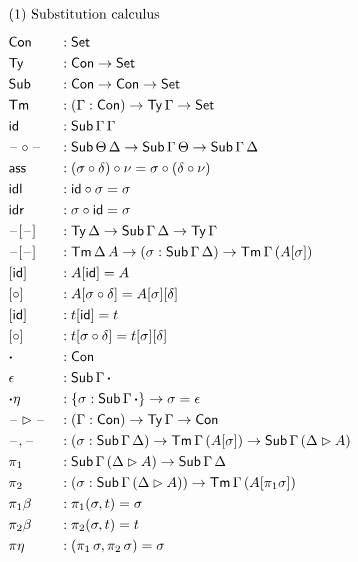 \documentclass[a4paper,UKenglish,cleveref, autoref]{lipics-v2019}
\begin{document}
\begin{alignat*}{5}
  & \rlap{(1) Substitution calculus} \\[0.5em]
  & \Con && : \Set \\
  & \Ty  && : \Con\ra\Set \\
  & \Sub  && : \Con\ra\Con\ra\Set \\
  & \Tm  && : (\Gamma:\Con)\ra\Ty\,\Gamma\ra\Set \\
  & \id && : \Sub\,\Gamma\,\Gamma \\
  & \blank\circ\blank && : \Sub\,\Theta\,\Delta\ra\Sub\,\Gamma\,\Theta\ra\Sub\,\Gamma\,\Delta \\
  & \ass && : (\sigma \circ \delta) \circ \nu = \sigma \circ (\delta \circ \nu) \\
  & \idl && : \id\circ\sigma = \sigma \\
  & \idr && : \sigma\circ\id = \sigma \\
  & \blank[\blank] && : \Ty\,\Delta\ra\Sub\,\Gamma\,\Delta\ra\Ty\,\Gamma \\
  & \blank[\blank] && : \Tm\,\Delta\,A\ra(\sigma:\Sub\,\Gamma\,\Delta)\ra\Tm\,\Gamma\,(A[\sigma]) \\
  & [\id] && : A[\id] = A \\
  & [\circ] && : A[\sigma \circ \delta] = A[\sigma][\delta] \\
  & [\id] && : t[\id] = t \\
  & [\circ] && : t[\sigma \circ \delta] = t[\sigma][\delta] \\
  & \boldsymbol{\cdot} && : \Con \\
  & \epsilon && : \Sub\,\Gamma\,\boldsymbol{\cdot} \\
  & {\boldsymbol{\cdot}\eta} && : \{\sigma : \Sub\,\Gamma\,\boldsymbol{\cdot}\} \ra \sigma = \epsilon \\
  & \blank\ext\blank && : (\Gamma:\Con)\ra\Ty\,\Gamma\ra\Con \\
  & \blank,\blank && : (\sigma:\Sub\,\Gamma\,\Delta)\ra\Tm\,\Gamma\,(A[\sigma])\ra\Sub\,\Gamma\,(\Delta\ext A) \\
  & \pi_1 && : \Sub\,\Gamma\,(\Delta\ext A)\ra \Sub\,\Gamma\,\Delta \\
  & \pi_2 && : (\sigma : \Sub\,\Gamma\,(\Delta\ext A))\ra \Tm\,\Gamma\,(A[\pi_1 \sigma]) \\
  & {\pi_1\beta} && : \pi_1(\sigma, t) = \sigma \\
  & {\pi_2\beta} && : \pi_2(\sigma, t) = t \\
  & {\pi\eta} && : (\pi_1\,\sigma, \pi_2\,\sigma) = \sigma \\

\end{alignat*}
\end{document}
